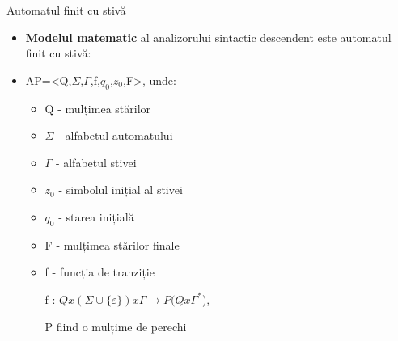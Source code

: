 \documentclass[pdf]{beamer}
\begin{document}
\begin{frame}{Automatul finit cu stivă}
\begin{itemize}

\item
\textbf{Modelul matematic} al analizorului sintactic descendent este automatul finit cu stivă:

\item
AP=<Q,$\Sigma$,$\Gamma$,f,$q_{0}$,$z_{0}$,F>, unde:

\begin{itemize}
\item 
\hspace{0.5cm}Q - mulțimea stărilor

\item
\hspace{0.5cm}$\Sigma$ - alfabetul automatului

\item
\hspace{0.5cm}$\Gamma$ - alfabetul stivei

\item
\hspace{0.5cm}$z_{0}$ - simbolul inițial al stivei

\item
\hspace{0.5cm}$q_{0}$ - starea inițială

\item
\hspace{0.5cm}F - mulțimea stărilor finale

\item
\hspace{0.5cm}f - funcția de tranziție

f : $Q x (\Sigma \cup \{\varepsilon\}) x \Gamma \to P (Q x \Gamma^{*}$),

P fiind o mulțime de perechi

\end{itemize}
\end{itemize}
\end{frame}
\end{document}
